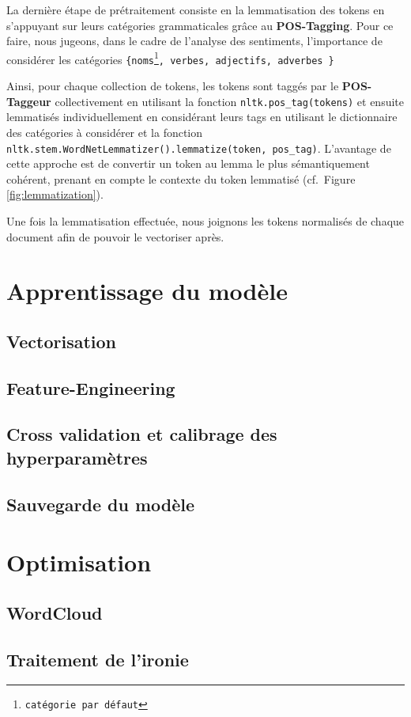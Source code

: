\documentclass[12pt,a4paper]{report}
\theoremstyle{definition}
\begin{document}
La dernière étape de prétraitement consiste en la lemmatisation des tokens en s'appuyant sur leurs catégories grammaticales grâce au \textbf{POS-Tagging}. Pour ce faire, nous jugeons, dans le cadre de l'analyse des sentiments, l'importance de considérer les catégories \texttt{\{noms\footnote{catégorie par défaut}, verbes, adjectifs, adverbes \}}

Ainsi, pour chaque collection de tokens, les tokens sont taggés par le \textbf{POS-Taggeur} collectivement en utilisant la fonction \texttt{nltk.pos\_tag(tokens)} et ensuite lemmatisés individuellement en considérant leurs tags en utilisant le dictionnaire des catégories à considérer et la fonction \texttt{nltk.stem.WordNetLemmatizer().lemmatize(token, pos\_tag)}. L'avantage de cette approche est de convertir un token au lemma le plus sémantiquement cohérent, prenant en compte le contexte du token lemmatisé (cf.~Figure \ref{fig:lemmatization}).

Une fois la lemmatisation effectuée, nous joignons les tokens normalisés de chaque document afin de pouvoir le vectoriser après.

\chapter{Apprentissage du modèle}
\section{Vectorisation}
\section{Feature-Engineering}
\section{Cross validation et calibrage des hyperparamètres}
\section{Sauvegarde du modèle}

\chapter{Optimisation}
\section{WordCloud}
\section{Traitement de l'ironie}
\end{document}
